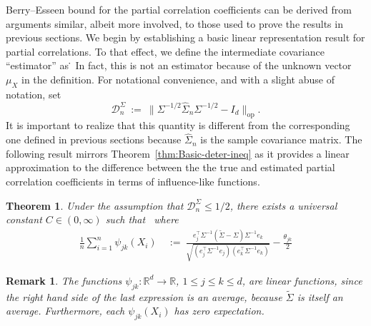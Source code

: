 \documentclass{article}
\newtheorem{theorem}{Theorem}
\newtheorem{remark}{Remark}
\begin{document}
 Berry--Esseen bound for the partial correlation coefficients can be derived from arguments similar, albeit more involved,  to those used to prove the results in previous sections. We begin by establishing a basic linear representation result for partial correlations. To that effect, we define the intermediate covariance ``estimator'' as
 \.
 \]
 In fact, this is not an estimator because of the unknown vector $\mu_X$ in the definition. For notational convenience, and with a slight abuse of notation, set
 \begin{equation}\label{eq:D-sigma-notation}
 \mathcal{D}_n^{\Sigma} ~:=~ \|\Sigma^{-1/2}\widehat{\Sigma}_n\Sigma^{-1/2} - I_d\|_{\mathrm{op}}. 
 \end{equation}
 It is important to realize that this quantity is different from the corresponding one defined in previous sections because $\widehat{\Sigma}_n$ is the sample covariance matrix. 
 The following result mirrors Theorem~\ref{thm:Basic-deter-ineq} as it provides a linear approximation to the difference between the the true and estimated partial correlation coefficients in terms of influence-like functions. 
 
  
 \begin{theorem}\label{thm:linear-expansion-partial-corr}
 Under the assumption that $\mathcal{D}_n^{\Sigma} \le 1/2$, there exists a universal constant $C\in(0, \infty)$ such that
 \
  where 
 \begin{equation}
 \begin{split}
 \frac{1}{n}\sum_{i=1}^n \psi_{jk}(X_i) ~&:=~ \frac{e_j^{\top}\Sigma^{-1}(\widetilde{\Sigma} - \Sigma)\Sigma^{-1}e_k}{\sqrt{(e_j^{\top}\Sigma^{-1}e_j)(e_k^{\top}\Sigma^{-1}e_k)}}
 
 
 - \frac{\theta_{jk}}{2}\left.
 \end{split}
 \end{equation}
 \end{theorem}
 
 \begin{remark}
 The functions $\psi_{jk} \colon \mathbb{R}^d \rightarrow \mathbb{R}$, $1 \leq j \leq k \leq d$, are linear functions, since the right hand side of the last expression is an average, because $\widetilde{\Sigma}$ is itself an average.
 Furthermore, each  $\psi_{jk}(X_i)$ has zero expectation.
 \end{remark}
 
 
 
\end{document}
